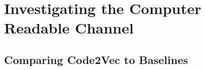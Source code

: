 





\section{Investigating the Computer Readable Channel} %
\label{sec:investigating_the_computer_channel}

\subsection{Comparing Code2Vec to Baselines} %
\label{sub:comparing_code2vec_to_baselines}

